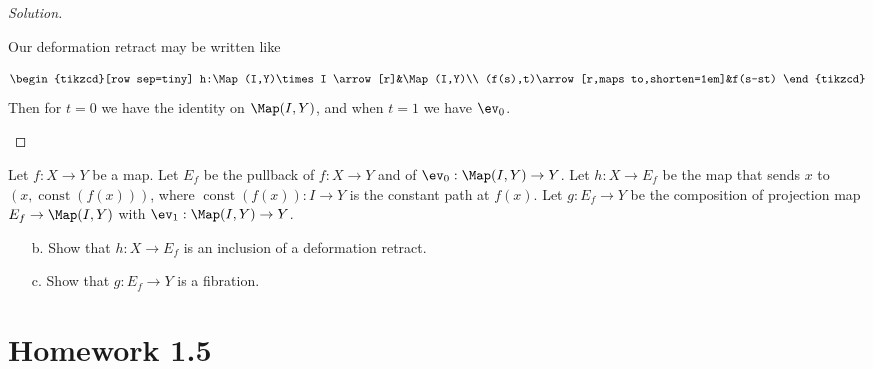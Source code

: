 \begin{proof}[Solution]
\begin{enumerate}[label*=\alph*.]
		Our deformation retract may be written like
		\iffalse\[\begin{tikzcd}[row sep=tiny]
			h:\Map(I,Y) \arrow[r]&\Map(I,\Map(I,Y))\\
			f(s)\arrow[r,maps to,shorten=2em]&t\mapsto f(s-st)
		\end{tikzcd}\]\fi
		\[\begin{tikzcd}[row sep=tiny]
			h:\Map(I,Y)\times I \arrow[r]&\Map(I,Y)\\
			(f(s),t)\arrow[r,maps to,shorten=1em]&f(s-st)
		\end{tikzcd}\]
		Then for $t=0$ we have the identity on $\Map(I,Y)$, and when $t=1$ we have $\ev_0$.
	\end{enumerate}
\end{proof}

Let $f : X \to Y$ be a map. Let $E_f$ be the pullback of $f : X \to Y$ and of $\ev_0 :\Map(I,Y)\to Y$. Let $h:X\to E_f$ be the map that sends $x$ to $(x,\operatorname{const}(f(x)))$, where $\operatorname{const}(f(x)) : I \to Y$ is the constant path at $f(x)$. Let $g : E_f \to Y$ be the composition of projection map $E_f \to \Map(I,Y)$ with $\ev_1 :\Map(I,Y)\to Y$.
\begin{exercise}
	\begin{enumerate}
		\item[b.] Show that $h:X\to E_{f}$ is an inclusion of a deformation retract.
		\item[c.] Show that $g:E_{f}\to Y$ is a fibration.
	\end{enumerate}
	
\end{exercise}


\section{Homework 1.5}
